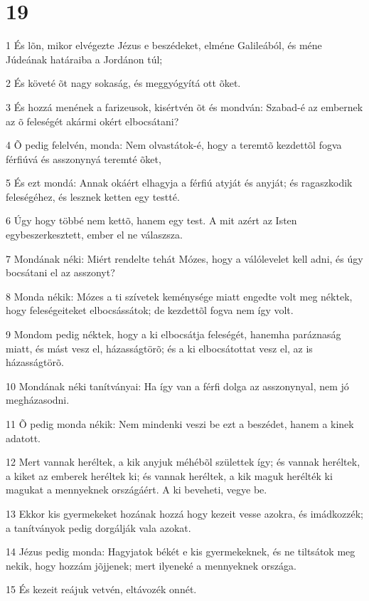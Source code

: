\chapter{19}

\par 1 És lõn, mikor elvégezte Jézus e beszédeket, elméne Galileából, és méne Júdeának határaiba a Jordánon túl;
\par 2 És követé õt nagy sokaság, és meggyógyítá ott õket.
\par 3 És hozzá menének a farizeusok, kisértvén õt és mondván: Szabad-é az embernek az õ feleségét akármi okért elbocsátani?
\par 4 Õ pedig felelvén, monda: Nem olvastátok-é, hogy a teremtõ kezdettõl fogva férfiúvá és asszonynyá teremté õket,
\par 5 És ezt mondá: Annak okáért elhagyja a férfiú atyját és anyját; és ragaszkodik feleségéhez, és lesznek ketten egy testté.
\par 6 Úgy hogy többé nem kettõ, hanem egy test. A mit azért az Isten egybeszerkesztett, ember el ne válaszsza.
\par 7 Mondának néki: Miért rendelte tehát Mózes, hogy a válólevelet kell adni, és úgy bocsátani el az asszonyt?
\par 8 Monda nékik: Mózes a ti szívetek keménysége miatt engedte volt meg néktek, hogy feleségeiteket elbocsássátok; de kezdettõl fogva nem így volt.
\par 9 Mondom pedig néktek, hogy a ki elbocsátja feleségét, hanemha paráznaság miatt, és mást vesz el, házasságtörõ; és a ki elbocsátottat vesz el, az is házasságtörõ.
\par 10 Mondának néki tanítványai: Ha így van a férfi dolga az asszonynyal, nem jó megházasodni.
\par 11 Õ pedig monda nékik: Nem mindenki veszi be ezt a beszédet, hanem a kinek adatott.
\par 12 Mert vannak heréltek, a kik anyjuk méhébõl születtek így; és vannak heréltek, a kiket az emberek heréltek ki; és vannak heréltek, a kik maguk herélték ki magukat a mennyeknek országáért. A ki beveheti, vegye be.
\par 13 Ekkor kis gyermekeket hozának hozzá hogy kezeit vesse azokra, és imádkozzék; a tanítványok pedig dorgálják vala azokat.
\par 14 Jézus pedig monda: Hagyjatok békét e kis gyermekeknek, és ne tiltsátok meg nekik, hogy hozzám jõjjenek; mert ilyeneké a mennyeknek országa.
\par 15 És kezeit reájuk vetvén, eltávozék onnét.
